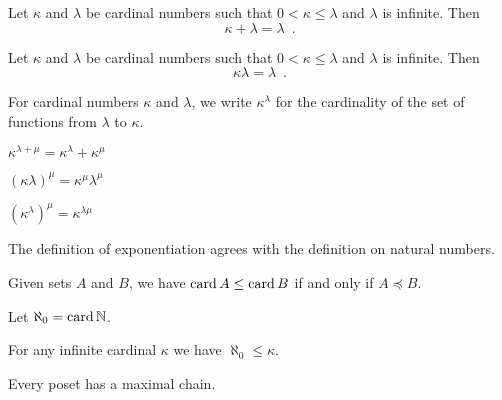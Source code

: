 \begin{theorem}
    Let $\kappa$ and $\lambda$ be cardinal numbers such that
    $0 < \kappa \leq \lambda$ and $\lambda$ is infinite. Then
    \[ \kappa + \lambda = \lambda \enspace . \]
\end{theorem}

\begin{theorem}
    Let $\kappa$ and $\lambda$ be cardinal numbers such that
    $0 < \kappa \leq \lambda$ and $\lambda$ is infinite. Then
    \[ \kappa \lambda = \lambda \enspace . \]
\end{theorem}

\begin{definition}
    For cardinal numbers $\kappa$ and $\lambda$, we write $\kappa^\lambda$
    for the cardinality of the set of functions from $\lambda$ to $\kappa$.
\end{definition}

\begin{theorem}
    $\kappa^{\lambda + \mu} = \kappa^\lambda + \kappa^\mu$
\end{theorem}

\begin{theorem}
    $(\kappa \lambda)^\mu = \kappa^\mu \lambda^\mu$
\end{theorem}

\begin{theorem}
    $(\kappa^\lambda)^\mu = \kappa^{\lambda \mu}$
\end{theorem}

\begin{theorem}
    The definition of exponentiation agrees with the definition on natural numbers.
\end{theorem}

\begin{theorem}
    Given sets $A$ and $B$, we have $\operatorname{card} A \leq \operatorname{card} B$ if and only if
    $A \preccurlyeq B$.
\end{theorem}

\begin{definition}
    Let $\aleph_0 = \operatorname{card} \mathbb{N}$.
\end{definition}

\begin{theorem}[AC]
    For any infinite cardinal $\kappa$ we have $\aleph_0 \leq \kappa$.
\end{theorem}

\begin{theorem}
    Every poset has a maximal chain.
\end{theorem}

